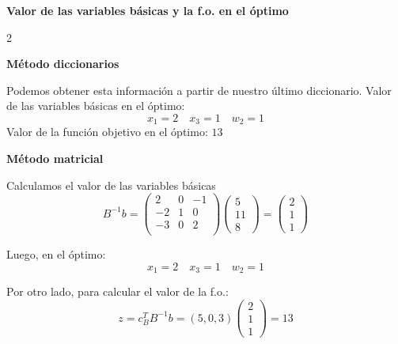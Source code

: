 \documentclass{article}
\newcommand{\binv}{B^{-1}}
\begin{document}
%
    \begin{center}
        \textbf{Valor de las variables básicas y la f.o. en el óptimo }
    \end{center}
    \begin{multicols}{2}
        \raggedcolumns
        \begin{center}
            \textbf{Método diccionarios}
        \end{center}

        Podemos obtener esta información a partir de nuestro último diccionario. Valor de las variables básicas en el
        óptimo:
        \[x_1 = 2 \quad x_3 = 1 \quad w_2 = 1\]
        Valor de la función objetivo en el óptimo: $13$
        \columnbreak
        \begin{center}
            \textbf{Método matricial}
        \end{center}

        Calculamos el valor de las variables básicas
        \[\binv b =         \begin{pmatrix}
                2 & 0 & -1 \\
                -2 & 1 & 0 \\
                -3 & 0 & 2 \\
        \end{pmatrix}
        \begin{pmatrix}
            5 \\
            11 \\
            8
        \end{pmatrix} =
        \begin{pmatrix}
            2 \\
            1 \\
            1
        \end{pmatrix}
        \]

        Luego, en el óptimo:
        \[x_1 = 2 \quad x_3 = 1 \quad w_2 = 1\]

        Por otro lado, para calcular el valor de la f.o.:
        \[z = c_B^T\binv b = (5,0,3)        \begin{pmatrix}
            2 \\
            1 \\
            1
        \end{pmatrix} = 13
    \]
    \end{multicols}
\end{document}
